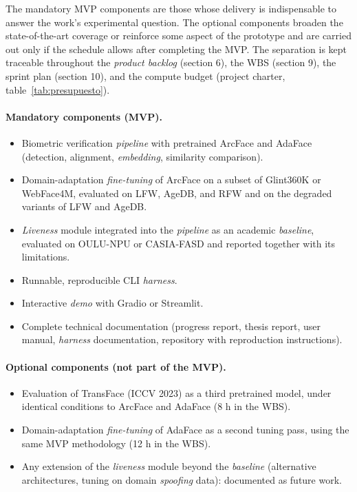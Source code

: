 \documentclass[
  11pt, %
]{charter}
\begin{document}
The mandatory MVP components are those whose delivery is indispensable to answer the work's experimental question. The optional components broaden the state-of-the-art coverage or reinforce some aspect of the prototype and are carried out only if the schedule allows after completing the MVP. The separation is kept traceable throughout the \textit{product backlog} (section 6), the WBS (section 9), the sprint plan (section 10), and the compute budget (project charter, table~\ref{tab:presupuesto}).

\paragraph{Mandatory components (MVP).}
\begin{itemize}
  \item Biometric verification \textit{pipeline} with pretrained ArcFace and AdaFace (detection, alignment, \textit{embedding}, similarity comparison).
  \item Domain-adaptation \textit{fine-tuning} of ArcFace on a subset of Glint360K or WebFace4M, evaluated on LFW, AgeDB, and RFW and on the degraded variants of LFW and AgeDB.
  \item \textit{Liveness} module integrated into the \textit{pipeline} as an academic \textit{baseline}, evaluated on OULU-NPU or CASIA-FASD and reported together with its limitations.
  \item Runnable, reproducible CLI \textit{harness}.
  \item Interactive \textit{demo} with Gradio or Streamlit.
  \item Complete technical documentation (progress report, thesis report, user manual, \textit{harness} documentation, repository with reproduction instructions).
\end{itemize}

\paragraph{Optional components (not part of the MVP).}
\begin{itemize}
  \item Evaluation of TransFace (ICCV 2023) as a third pretrained model, under identical conditions to ArcFace and AdaFace (8 h in the WBS).
  \item Domain-adaptation \textit{fine-tuning} of AdaFace as a second tuning pass, using the same MVP methodology (12 h in the WBS).
  \item Any extension of the \textit{liveness} module beyond the \textit{baseline} (alternative architectures, tuning on domain \textit{spoofing} data): documented as future work.
\end{itemize}
\end{document}
